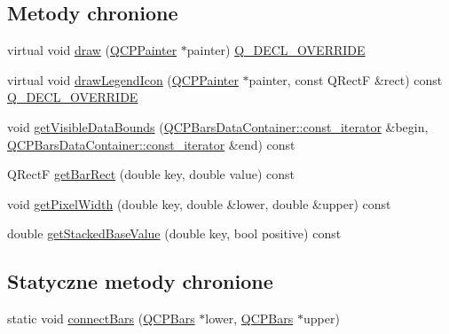 \subsection*{Metody chronione}
\begin{DoxyCompactItemize}
\item 
virtual void \hyperlink{class_q_c_p_bars_aa267c20650d55084c3f47cb2f8fac9dc}{draw} (\hyperlink{class_q_c_p_painter}{Q\+C\+P\+Painter} $\ast$painter) \hyperlink{qcustomplot_8hh_a42cc5eaeb25b85f8b52d2a4b94c56f55}{Q\+\_\+\+D\+E\+C\+L\+\_\+\+O\+V\+E\+R\+R\+I\+DE}
\item 
virtual void \hyperlink{class_q_c_p_bars_aee7c3e1763fd6b504c45baa8775be7b7}{draw\+Legend\+Icon} (\hyperlink{class_q_c_p_painter}{Q\+C\+P\+Painter} $\ast$painter, const Q\+RectF \&rect) const \hyperlink{qcustomplot_8hh_a42cc5eaeb25b85f8b52d2a4b94c56f55}{Q\+\_\+\+D\+E\+C\+L\+\_\+\+O\+V\+E\+R\+R\+I\+DE}
\item 
void \hyperlink{class_q_c_p_bars_ac7bd86184d5baad410cd0d9c5c07f126}{get\+Visible\+Data\+Bounds} (\hyperlink{class_q_c_p_data_container_ae40a91f5cb0bcac61d727427449b7d15}{Q\+C\+P\+Bars\+Data\+Container\+::const\+\_\+iterator} \&begin, \hyperlink{class_q_c_p_data_container_ae40a91f5cb0bcac61d727427449b7d15}{Q\+C\+P\+Bars\+Data\+Container\+::const\+\_\+iterator} \&end) const 
\item 
Q\+RectF \hyperlink{class_q_c_p_bars_a2d279b96f3d8385b865ff7c11c1c608a}{get\+Bar\+Rect} (double key, double value) const 
\item 
void \hyperlink{class_q_c_p_bars_a794eefe4fb29b9b40583654ccbf460dc}{get\+Pixel\+Width} (double key, double \&lower, double \&upper) const 
\item 
double \hyperlink{class_q_c_p_bars_ae9b0c2fad9f29030c84bb6e62a4b605f}{get\+Stacked\+Base\+Value} (double key, bool positive) const 
\end{DoxyCompactItemize}
\subsection*{Statyczne metody chronione}
\begin{DoxyCompactItemize}
\item 
static void \hyperlink{class_q_c_p_bars_a6ea37802cd22f97235cab614b14b9f19}{connect\+Bars} (\hyperlink{class_q_c_p_bars}{Q\+C\+P\+Bars} $\ast$lower, \hyperlink{class_q_c_p_bars}{Q\+C\+P\+Bars} $\ast$upper)
\end{DoxyCompactItemize}

